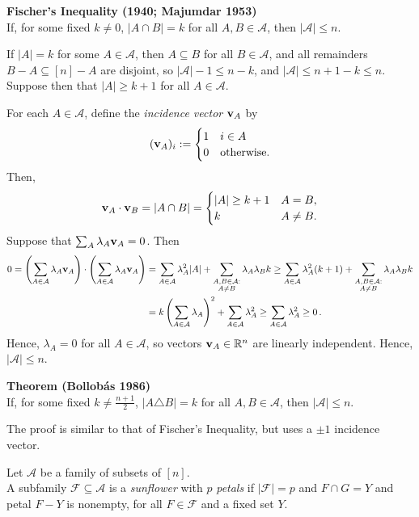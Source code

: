 \documentclass[a4paper]{article}
\let\oldendproof\endproof
\renewenvironment{proof}[1][\proofname]{%
  \oldproof[\scshape \noindent {\bfseries \text{Proof}}]%
}{\oldendproof}
\newcommand{\definition}{\bigskip\noindent{\bf Definition.}\;\;}
\newenvironment{thm}[1]{
	\begin{framed}
	\noindent
	{\bfseries #1}\\}{\setlength{\itemsep}{0pt}
	\end{framed}
}
\newcommand{\Af}{\mathcal{A}}
\newcommand{\Ff}{\mathcal{F}}
\newcommand{\RR}{\mathbb{R}}
\newcommand{\vb}{\text{{\bfseries v}}}
\begin{document}
\begin{thm}{Fischer's Inequality (1940; Majumdar 1953)}
If, for some fixed $k \neq 0$, $|A \cap B| = k$ for all $A, B \in \Af$, then $|\Af| \leq n$.
\end{thm}

\begin{proof}
If $|A| = k$ for some $A \in \Af$, then $A \subseteq B$ for all $B \in \Af$,
and all remainders $B-A \subseteq [n] - A$ are disjoint,
so $|\Af| - 1 \leq n-k$, and $|\Af| \leq n+1-k \leq n$.
Suppose then that $|A| \geq k+1$ for all $A \in \Af$.

For each $A \in \Af$, define the \emph{incidence vector} $\vb_A$ by
	\[(\vb_A)_i: = \begin{cases}
		1  & i \in A \\
		0  & \text{otherwise}.
	\end{cases}\]
Then,
	\[\vb_A \cdot \vb_B = |A \cap B| = \begin{cases}
		|A| \geq k+1  & A= B,\\
		k             & A \neq B.
	\end{cases}\]
Suppose that $\sum_A \lambda_A \vb_A = 0$. Then
\begin{align*}
	  0
    = \left(\sum_{A \in \Af} \lambda_A \vb_A\right)\cdot\left(\sum_{A \in \Af} \lambda_A\vb_A\right)
  & = \sum_{A \in \Af} \lambda_A^2 |A| + \sum_{\substack{A,B \in \Af:\\ A \neq B}} \lambda_A\lambda_B k
    \geq \sum_{A \in \Af} \lambda_A^2 (k+1) + \sum_{\substack{A,B \in \Af:\\ A \neq B}}\lambda_A \lambda_B k\\
  & = k\left(\sum_{A \in \Af} \lambda_A\right)^2 + \sum_{A \in \Af} \lambda_A^2
    \geq \sum_{A\in \Af} \lambda_A^2
    \geq 0\,.
\end{align*}
Hence, $\lambda_A = 0$ for all $A \in \Af$, so vectors $\vb_A \in \RR^n$ are linearly independent.
Hence, $|\Af| \leq n$.
\end{proof}

\begin{thm}{Theorem (Bollob\'as 1986)}
If, for some fixed $k \neq \frac{n+1}{2}$, $|A \triangle B| = k$ for all $A,B \in \Af$,
then $|\Af| \leq n$.
\end{thm}

The proof is similar to that of Fischer's Inequality, but uses a $\pm 1$ incidence vector.

\definition
Let $\Af$ be a family of subsets of $[n]$.\\
A subfamily $\Ff\subseteq \Af$ is a \emph{sunflower} with $p$ \emph{petals}
if $|\Ff| = p$ and $F \cap G = Y$ and petal $F-Y$ is nonempty,
for all $F \in \Ff$ and a fixed set $Y$.
\end{document}
